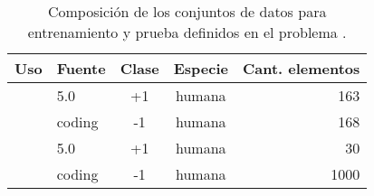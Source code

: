 %
\begin{table}[h]
  \tableStyle
  \begin{tabular}{llScr}
    \toprule
    Uso & Fuente  &{Clase}& Especie & Cant. elementos \\
    \midrule
    & \mirbase{} 5.0 &    +1 & humana  &             163 \\
    & coding         &    -1 & humana  &             168 \\
    \midrule
    & \mirbase{} 5.0 &    +1 & humana  &              30 \\
    & coding         &    -1 & humana  &            1000 \\
    \bottomrule
  \end{tabular}
  \caption{\captionStyle Composición de los conjuntos de datos para
    entrenamiento y prueba definidos en el problema
    \sbs\tripletsvm{}.}
  \label{tbl:mainxue}
\end{table}
%
